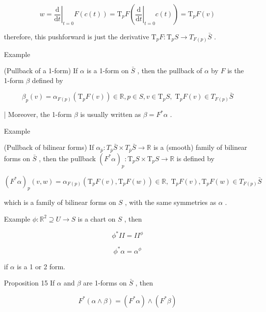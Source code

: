 \documentclass[lang=cn,a4paper,11pt,openany,twoside]{elegantbook}
\begin{document}
\[
w = {\left. \frac{\mathrm{d}}{\mathrm{d}t}\right| }_{t = 0}F\left( {c\left( t\right) }\right)  = {\mathrm{T}}_{p}F\left( {{\left. \frac{\mathrm{d}}{\mathrm{d}t}\right| }_{t = 0}c\left( t\right) }\right)  = {\mathrm{T}}_{p}F\left( v\right)
\]

therefore, this pushforward is just the derivative \({\mathrm{T}}_{p}F : {\mathrm{T}}_{p}S \rightarrow  {T}_{F\left( p\right) }\bar{S}\) .

Example

(Pullback of a 1-form) If \(\alpha\) is a 1-form on \(\bar{S}\) , then the pullback of \(\alpha\) by \(F\) is the 1-form \(\beta\) defined by

\[
{\beta }_{p}\left( v\right)  = {\alpha }_{F\left( p\right) }\left( {{\mathrm{T}}_{p}F\left( v\right) }\right)  \in  \mathbb{R},p \in  S,v \in  {\mathrm{T}}_{p}S,{\mathrm{\;T}}_{p}F\left( v\right)  \in  {T}_{F\left( p\right) }\bar{S}
\]

| Moreover, the 1-form \(\beta\) is usually written as \(\beta  = {F}^{ * }\alpha\) .

Example

(Pullback of bilinear forms) If \({\alpha }_{\bar{p}} : {T}_{\bar{p}}\bar{S} \times  {T}_{\bar{p}}\bar{S} \rightarrow  \mathbb{R}\) is a (smooth) family of bilinear forms on \(\bar{S}\) , then the pullback \({\left( {F}^{ * }\alpha \right) }_{p} : {\mathrm{T}}_{p}S \times  {\mathrm{T}}_{p}S \rightarrow  \mathbb{R}\) is defined by

\[
{\left( {F}^{ * }\alpha \right) }_{p}\left( {v,w}\right)  = {\alpha }_{F\left( p\right) }\left( {{\mathrm{T}}_{p}F\left( v\right) ,{\mathrm{T}}_{p}F\left( w\right) }\right)  \in  \mathbb{R},\;{\mathrm{T}}_{p}F\left( v\right) ,{\mathrm{T}}_{p}F\left( w\right)  \in  {T}_{F\left( p\right) }\bar{S}
\]

which is a family of bilinear forms on \(S\) , with the same symmetries as \(\alpha\) .

Example \(\phi  : {\mathbb{R}}^{2} \supseteq  U \rightarrow  S\) is a chart on \(S\) , then

\[
{\phi }^{ * }{II} = I{I}^{\phi }
\]

\[
{\phi }^{ * }\alpha  = {\alpha }^{\phi }
\]

if \(\alpha\) is a 1 or 2 form.

Proposition 15 If \(\alpha\) and \(\beta\) are 1-forms on \(\bar{S}\) , then

\[
{F}^{ * }\left( {\alpha  \land  \beta }\right)  = \left( {{F}^{ * }\alpha }\right)  \land  \left( {{F}^{ * }\beta }\right)
\]
\end{document}
